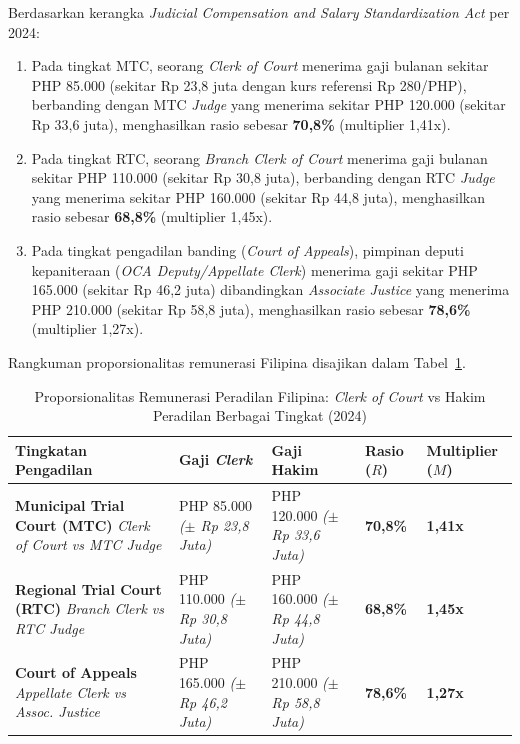 \documentclass[12pt, a4paper]{article}
\begin{document}
Berdasarkan kerangka \textit{Judicial Compensation and Salary Standardization Act} per 2024:
\begin{enumerate}
    \item Pada tingkat MTC, seorang \textit{Clerk of Court} menerima gaji bulanan sekitar PHP 85.000 (sekitar Rp 23,8 juta dengan kurs referensi Rp 280/PHP), berbanding dengan MTC \textit{Judge} yang menerima sekitar PHP 120.000 (sekitar Rp 33,6 juta), menghasilkan rasio sebesar \textbf{70,8\%} (multiplier 1,41x).
    \item Pada tingkat RTC, seorang \textit{Branch Clerk of Court} menerima gaji bulanan sekitar PHP 110.000 (sekitar Rp 30,8 juta), berbanding dengan RTC \textit{Judge} yang menerima sekitar PHP 160.000 (sekitar Rp 44,8 juta), menghasilkan rasio sebesar \textbf{68,8\%} (multiplier 1,45x).
    \item Pada tingkat pengadilan banding (\textit{Court of Appeals}), pimpinan deputi kepaniteraan (\textit{OCA Deputy/Appellate Clerk}) menerima gaji sekitar PHP 165.000 (sekitar Rp 46,2 juta) dibandingkan \textit{Associate Justice} yang menerima PHP 210.000 (sekitar Rp 58,8 juta), menghasilkan rasio sebesar \textbf{78,6\%} (multiplier 1,27x).
\end{enumerate}

Rangkuman proporsionalitas remunerasi Filipina disajikan dalam Tabel~\ref{tab:komparasi-filipina-lengkap}.

\begin{table}[H]
\centering
\fontsize{9}{11}\selectfont
\caption{Proporsionalitas Remunerasi Peradilan Filipina: \textit{Clerk of Court} vs Hakim Peradilan Berbagai Tingkat (2024)}
\label{tab:komparasi-filipina-lengkap}
\renewcommand{\arraystretch}{1.35}
\begin{tabular}{p{5.0cm} p{2.7cm} p{2.7cm} p{1.7cm} p{1.7cm}}
\hline
\textbf{Tingkatan Pengadilan} & \textbf{Gaji \textit{Clerk}} & \textbf{Gaji Hakim} & \textbf{Rasio ($R$)} & \textbf{Multiplier ($M$)} \tabularnewline
\hline
\raggedright\textbf{Municipal Trial Court (MTC)} \newline \textit{Clerk of Court vs MTC Judge} & PHP 85.000 \newline \textit{($\pm$ Rp 23,8 Juta)} & PHP 120.000 \newline \textit{($\pm$ Rp 33,6 Juta)} & \textbf{70,8\%} & \textbf{1,41x} \tabularnewline
\raggedright\textbf{Regional Trial Court (RTC)} \newline \textit{Branch Clerk vs RTC Judge} & PHP 110.000 \newline \textit{($\pm$ Rp 30,8 Juta)} & PHP 160.000 \newline \textit{($\pm$ Rp 44,8 Juta)} & \textbf{68,8\%} & \textbf{1,45x} \tabularnewline
\raggedright\textbf{Court of Appeals} \newline \textit{Appellate Clerk vs Assoc. Justice} & PHP 165.000 \newline \textit{($\pm$ Rp 46,2 Juta)} & PHP 210.000 \newline \textit{($\pm$ Rp 58,8 Juta)} & \textbf{78,6\%} & \textbf{1,27x} \tabularnewline
\hline
\end{tabular}
\end{table}
\end{document}
